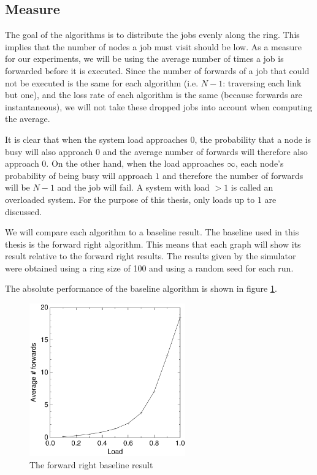 \documentclass[10pt,a4paper]{article}
\begin{document}
\subsection{Measure}
The goal of the algorithms is to distribute the jobs evenly along the ring. This implies that the number of nodes a job must visit should be low. As a measure for our experiments, we will be using the average number of times a job is forwarded before it is executed. Since the number of forwards of a job that could not be executed is the same for each algorithm (i.e. $N-1$: traversing each link but one), and the loss rate of each algorithm is the same (because forwards are instantaneous), we will not take these dropped jobs into account when computing the average.

It is clear that when the system load approaches $0$, the probability that a node is busy will also approach $0$ and the average number of forwards will therefore also approach $0$. On the other hand, when the load approaches $\infty$, each node's probability of being busy will approach $1$ and therefore the number of forwards will be $N-1$ and the job will fail. A system with load $> 1$ is called an overloaded system. For the purpose of this thesis, only loads up to $1$ are discussed.

We will compare each algorithm to a baseline result. The baseline used in this thesis is the forward right algorithm. This means that each graph will show its result relative to the forward right results. The results given by the simulator were obtained using a ring size of 100 and using a random seed for each run.

The absolute performance of the baseline algorithm is shown in figure \ref{baseline}.

\begin{figure}[h!tb]
\centering
\includegraphics[width=0.6\textwidth]{data/right.pdf}
\caption{The forward right baseline result}
\label{baseline}
\end{figure}
\end{document}
